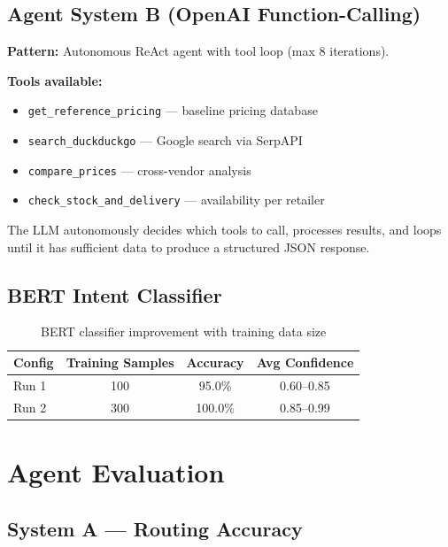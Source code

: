 \documentclass[12pt,a4paper]{article}
\begin{document}
\subsection{Agent System B (OpenAI Function-Calling)}

\textbf{Pattern:} Autonomous ReAct agent with tool loop (max 8 iterations).

\textbf{Tools available:}
\begin{itemize}
  \item \texttt{get\_reference\_pricing} — baseline pricing database
  \item \texttt{search\_duckduckgo} — Google search via SerpAPI
  \item \texttt{compare\_prices} — cross-vendor analysis
  \item \texttt{check\_stock\_and\_delivery} — availability per retailer
\end{itemize}

The LLM autonomously decides which tools to call, processes results, and loops until it has sufficient data to produce a structured JSON response.

\subsection{BERT Intent Classifier}

\begin{table}[H]
\centering
\begin{tabular}{lccc}
\toprule
\textbf{Config} & \textbf{Training Samples} & \textbf{Accuracy} & \textbf{Avg Confidence} \\
\midrule
Run 1 & 100 & 95.0\% & 0.60--0.85 \\
Run 2 & 300 & 100.0\% & 0.85--0.99 \\
\bottomrule
\end{tabular}
\caption{BERT classifier improvement with training data size}
\end{table}

\section{Agent Evaluation}

\subsection{System A — Routing Accuracy}
\end{document}

